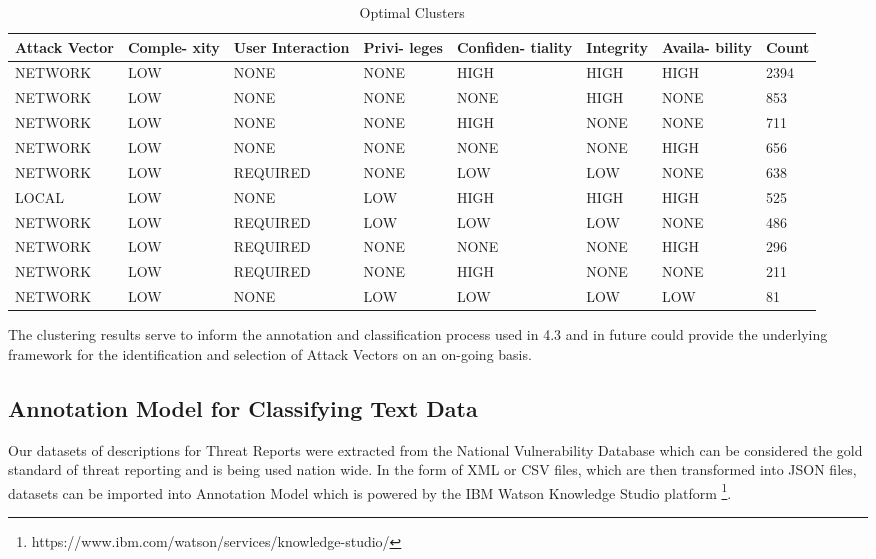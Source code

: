 \documentclass{article} %
\begin{document}
\begin{table}[ht]
\begin{center}
\begin{tabular}{ |l|p{1.3cm}|p{1.8cm}|p{1cm}|p{1.3cm}|p{1cm}|p{1cm}|p{0.7cm}| } \hline
Attack Vector & Comple- xity & User Interaction & Privi- leges & Confiden- tiality & Integrity & Availa- bility & Count \\ \hline
NETWORK & LOW & NONE & NONE & HIGH & HIGH & HIGH & 2394 \\
NETWORK & LOW & NONE & NONE & NONE & HIGH & NONE & 853 \\
NETWORK & LOW & NONE & NONE & HIGH & NONE & NONE & 711 \\
NETWORK & LOW & NONE & NONE & NONE & NONE & HIGH & 656 \\
NETWORK & LOW & REQUIRED & NONE & LOW & LOW & NONE & 638 \\ 
LOCAL & LOW & NONE & LOW & HIGH & HIGH & HIGH & 525 \\
NETWORK & LOW & REQUIRED & LOW & LOW & LOW & NONE & 486 \\
NETWORK & LOW & REQUIRED & NONE & NONE & NONE & HIGH & 296 \\
NETWORK & LOW & REQUIRED & NONE & HIGH & NONE & NONE & 211 \\
NETWORK & LOW & NONE & LOW & LOW & LOW & LOW & 81 \\
\hline
\end{tabular}
\caption{Optimal Clusters}
\end{center}
\label{table:1}
\end{table}

The clustering results serve to inform the annotation and classification process used in 4.3 and in future could provide the underlying framework for the identification and selection of Attack Vectors on an on-going basis.


\subsection{Annotation Model for Classifying Text Data}
Our datasets of descriptions for Threat Reports were extracted from the National Vulnerability Database which can be considered the gold standard of threat reporting and is being used nation wide. In the form of XML or CSV files, which are then transformed into JSON files, datasets can be imported into Annotation Model which is powered by the IBM Watson Knowledge Studio platform \footnote{https://www.ibm.com/watson/services/knowledge-studio/}.
\end{document}

